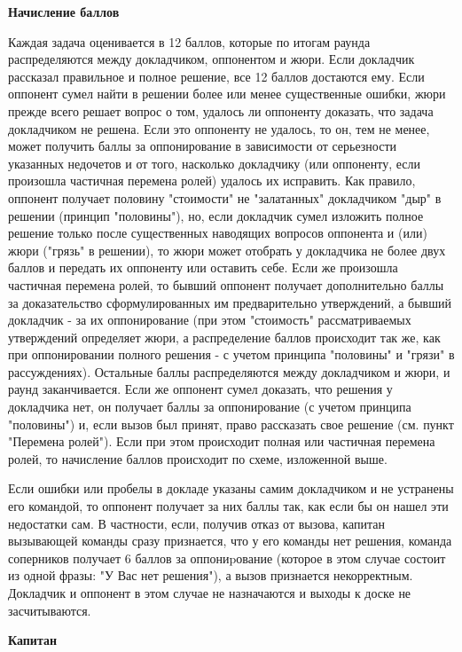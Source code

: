 \documentclass{article}
\begin{document}
\begin{center}
\textbf{Начисление баллов}
\end{center}

Каждая задача оценивается в 12 баллов, которые по итогам раунда распределяются между докладчиком, оппонентом и жюри. Если докладчик рассказал правильное и полное решение, все 12 баллов достаются ему. Если оппонент сумел найти в решении более или менее существенные ошибки, жюри прежде всего решает вопрос о том, удалось ли оппоненту доказать, что задача докладчиком не решена. Если это оппоненту не удалось, то он, тем не менее, может получить баллы за оппонирование в зависимости от серьезности указанных недочетов и от того, насколько докладчику (или оппоненту, если произошла частичная перемена ролей) удалось их исправить. Как правило, оппонент получает половину "стоимости" не "залатанных" докладчиком "дыр" в решении (принцип "половины"), но, если докладчик сумел изложить полное решение только после существенных наводящих вопросов оппонента и (или) жюри ("грязь" в решении), то жюри может отобрать у докладчика не более двух баллов и передать их оппоненту или оставить себе. Если же произошла частичная перемена ролей, то бывший оппонент получает дополнительно баллы за доказательство сформулированных им предварительно утверждений, а бывший докладчик - за их оппонирование (при этом "стоимость" рассматриваемых утверждений определяет жюри, а распределение баллов происходит так же, как при оппонировании полного решения - с учетом принципа "половины" и "грязи" в рассуждениях). Остальные баллы распределяются между докладчиком и жюри, и раунд заканчивается. Если же оппонент сумел доказать, что решения у докладчика нет, он получает баллы за оппонирование (с учетом принципа "половины") и, если вызов был принят, право рассказать свое решение (см. пункт "Перемена ролей"). Если при этом происходит полная или частичная перемена ролей, то начисление баллов происходит по схеме, изложенной выше.

Если ошибки или пробелы в докладе указаны самим докладчиком и не устранены его командой, то оппонент получает за них баллы так, как если бы он нашел эти недостатки сам. В частности, если, получив отказ от вызова, капитан вызывающей команды сразу признается, что у его команды нет решения, команда соперников получает 6 баллов за оппониpование (которое в этом случае состоит из одной фразы: "У Вас нет решения"), а вызов признается некорректным. Докладчик и оппонент в этом случае не назначаются и выходы к доске не засчитываются.

\begin{center}
\textbf{Капитан}
\end{center}
\end{document}
